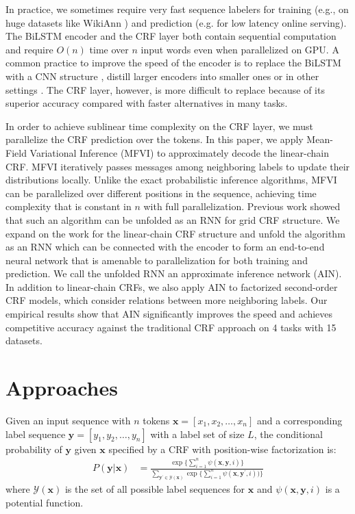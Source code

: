 \documentclass[11pt,a4paper]{article}
\newcommand{\xvec}{\mathbf{x}}
\newcommand{\yvec}{\mathbf{y}}
\begin{document}
In practice, we sometimes require very fast sequence labelers for training (e.g., on huge datasets like WikiAnn \cite{pan-etal-2017-cross}) and prediction (e.g. for low latency online serving). The BiLSTM encoder and the CRF layer both contain sequential computation and require $O(n)$ time over $n$ input words even when parallelized on GPU. A common practice to improve the speed of the encoder is to replace the BiLSTM with a CNN structure \cite{collobert2011natural,strubell-etal-2017-fast}, distill larger encoders into smaller ones \cite{tsai-etal-2019-small,mukherjee2020tinymbert} or in other settings \cite{tu2018learning,yang-etal-2018-design,tu-gimpel-2019-benchmarking,cui-zhang-2019-hierarchically}. The CRF layer, however, is more difficult to replace because of its superior accuracy compared with faster alternatives in many tasks. 

In order to achieve sublinear time complexity on the CRF layer, we must parallelize the CRF prediction over the tokens. In this paper, we apply Mean-Field Variational Inference (MFVI) to approximately decode the linear-chain CRF. MFVI iteratively passes messages among neighboring labels to update their distributions locally. Unlike the exact probabilistic inference algorithms, MFVI can be parallelized over different positions in the sequence, achieving time complexity that is constant in $n$ with full parallelization.
Previous work \cite{zheng2015conditional} showed that such an algorithm can be unfolded as an RNN for grid CRF structure. We expand on the work for the linear-chain CRF structure and unfold the algorithm as an RNN
which can be connected with the encoder to form an end-to-end neural network that is amenable to parallelization for both training and prediction. We call the unfolded RNN an approximate inference network (AIN). In addition to linear-chain CRFs, we also apply AIN to factorized second-order CRF models, which consider relations between more neighboring labels. Our empirical results show that AIN significantly improves the speed and achieves competitive accuracy against the traditional CRF approach on 4 tasks with 15 datasets.



\section{Approaches}
Given an input sequence with $n$ tokens $\xvec=[x_1,x_2,\dots,x_n]$ and a corresponding label sequence $\yvec=[y_1,y_2,\dots,y_n]$ with a label set of size $L$, the conditional probability of $\yvec$ given $\xvec$ specified by a CRF with position-wise factorization is:
\begin{align}
P(\yvec|\xvec) &= \frac{ \exp\{\sum\limits_{i=1}^{n}\psi(\xvec, \yvec, i)\}}{\sum\limits_{\yvec^{\prime} \in \mathcal{Y}(\xvec)} \exp\{\sum\limits_{i=1}^{n}\psi(\xvec, \yvec^{\prime}, i))\}}\nonumber \end{align}
where $\mathcal{Y}(\mathbf{x})$ is the set of all possible label sequences for $\xvec$ and $\psi(\xvec, \yvec, i)$ is a potential function. 
\end{document}
